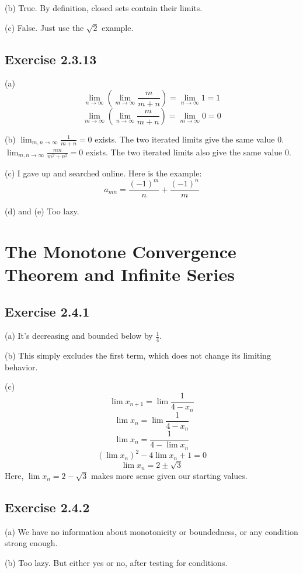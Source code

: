 \documentclass{book}
\begin{document}
\noindent
(b)
True. By definition, closed sets contain their limits.

\noindent
(c)
False. Just use the $\sqrt{2}$ example.

\subsection*{Exercise 2.3.13}
(a)
$$\lim_{n \rightarrow \infty} \left( \lim_{m \rightarrow \infty} \frac{m}{m + n} \right) = \lim_{n \rightarrow \infty} 1 = 1$$
$$\lim_{m \rightarrow \infty} \left( \lim_{n \rightarrow \infty} \frac{m}{m + n} \right) = \lim_{m \rightarrow \infty} 0 = 0$$

\noindent
(b)
$\lim_{m, n \rightarrow \infty} \frac{1}{m + n} = 0$ exists. The two iterated limits give the same value 0. $\lim_{m, n \rightarrow \infty} \frac{mn}{m^2 + n^2} = 0$ exists. The two iterated limits also give the same value 0.

\noindent
(c)
I gave up and searched online. Here is the example:
$$a_{mn} = \frac{(-1)^m}{n} + \frac{(-1)^n}{m}$$

\noindent
(d) and (e) Too lazy.

\section{The Monotone Convergence Theorem and Infinite Series}

\subsection*{Exercise 2.4.1}
(a)
It's decreasing and bounded below by $\frac{1}{4}$.

\noindent
(b)
This simply excludes the first term, which does not change its limiting behavior.

\noindent
(c)
$$\lim x_{n + 1} = \lim \frac{1}{4 - x_n}$$
$$\lim x_n = \lim \frac{1}{4 - x_n}$$
$$\lim x_n = \frac{1}{4 - \lim x_n}$$
$$(\lim x_n)^2 - 4 \lim x_n + 1 = 0$$
$$\lim x_n = 2 \pm \sqrt{3}$$
Here, $\lim x_n = 2 - \sqrt{3}$ makes more sense given our starting values.

\subsection*{Exercise 2.4.2}
(a)
We have no information about monotonicity or boundedness, or any condition strong enough.

\noindent
(b)
Too lazy. But either yes or no, after testing for conditions.
\end{document}
